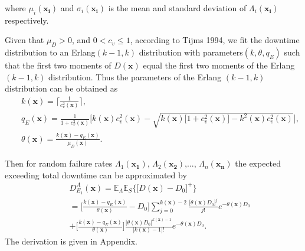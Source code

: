 \documentclass[preprint,12pt]{elsarticle}
\begin{document}
where $\mu_{i}(\boldsymbol{x_i})$ and $\sigma_{i}(\boldsymbol{x_i})$ is the mean and standard deviation of $\Lambda_{i}(\boldsymbol{x_i})$ respectively.


Given that $\mu_{D}>0$, and $0<c_{v}\leq 1$, according to Tijms 1994, we fit the downtime distribution to an Erlang$(k-1,k)$ distribution with parameters$(k,\theta,q_{E})$ such that the first two moments of $D(\boldsymbol{x})$ equal the first two moments of the Erlang $(k-1,k)$ distribution. Thus the parameters of the Erlang $(k-1,k)$ distribution can be obtained as
\begin{eqnarray}
&&k(\boldsymbol{x}) = \lceil \frac{1}{c_{v}^{2}(\boldsymbol{x})} \rceil, \label{k1}\\
&&q_{E}(\boldsymbol{x})= \frac{1}{1+c^{2}_{v}(\boldsymbol{x})}\bigg[k(\boldsymbol{x})c^{2}_{v}(\boldsymbol{x})-\sqrt{k(\boldsymbol{x})\big[1+c^{2}_{v}(\boldsymbol{x})\big]-k^{2}(\boldsymbol{x})c^{2}_{v}(\boldsymbol{x})} \bigg], \label{q1}\\
&&\theta(\boldsymbol{x}) = \frac{k(\boldsymbol{x})-q_{E}(\boldsymbol{x})}{\mu_{D}(\boldsymbol{x})}. \label{theta1}
\end{eqnarray}

 Then for random failure rates $\Lambda_{1}(\boldsymbol{x_{1}})$, $\Lambda_{2}(\boldsymbol{x_{2}})$,..., $\Lambda_{n}(\boldsymbol{x_{n}})$ the expected exceeding total downtime can be approximated by
\begin{eqnarray}
&&D_{E_{1}}^{A}(\boldsymbol{x})=\mathbb{E}_{\Lambda}\mathbb{E}_{S}\bigg\{\big[D(\boldsymbol{x})-D_{0}\big]^{+}\bigg\} \nonumber\\
&&=\bigg[\frac{k(\boldsymbol{x})-q_{E}(\boldsymbol{x})}{\theta(\boldsymbol{x})}-D_{0}\bigg]\sum_{j=0}^{k(\boldsymbol{x})-2}{\frac{\big[\theta(\boldsymbol{x}) D_{0}\big]^j}{j!}e^{-\theta(\boldsymbol{x})D_{0}}}\nonumber\\
&&+\bigg[\frac{k(\boldsymbol{x})-q_{E}(\boldsymbol{x})}{\theta(\boldsymbol{x})}\bigg]\frac{\big[\theta(\boldsymbol{x})D_{0}\big]^{k(\boldsymbol{x})-1}}{\big[k(\boldsymbol{x})-1\big]!}e^{-\theta(\boldsymbol{x})D_{0}}.
\label{EXD1}
\end{eqnarray}
The derivation is given in Appendix.
\end{document}
